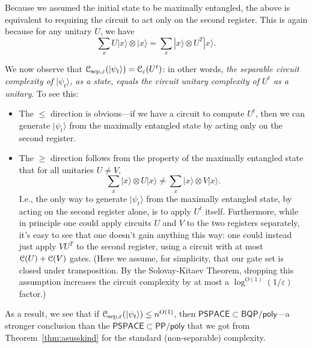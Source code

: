 \documentclass[11pt]{report}
\theoremstyle{plain}
\theoremstyle{definition}
\newcommand{\eps}{\varepsilon}
\renewcommand{\ket}[1]{|#1\rangle}
\begin{document}
Because we assumed the initial state to be maximally entangled, the above is equivalent to requiring the circuit to act only on the second register.  This is again because for any unitary $U$, we have
$$\sum_x U \ket{x} \otimes \ket{x} = \sum_x \ket{x} \otimes U^T \ket{x}.$$

We now observe that ${\cal C}_{\mathrm{sep},\eps}(\ket{\psi_t}) =
{\cal C}_\eps (U^t)$: in other words, {\em the separable circuit complexity of $\ket{\psi_t}$, as a state, equals the circuit unitary complexity of $U^t$ as a unitary}.
To see this:
\begin{itemize}
\item The $\le$ direction is obvious---if we have a circuit to compute $U^t$, then we can generate $\ket{\psi_t}$ from the maximally entangled state by acting only on the second register.
\item The $\ge$ direction follows from the property of the maximally entangled state that for all unitaries $U \neq V$,
$$\sum_x \ket{x} \otimes U \ket{x} \neq \sum_x \ket{x} \otimes V \ket{x}.$$
I.e., the only way to generate $\ket{\psi_t}$ from the maximally entangled state, by acting on the second register alone, is to apply $U^t$ itself. Furthermore, while in principle one could apply circuits $U$ and $V$ to the two registers separately, it's easy to see that one doesn't gain anything this way: one could instead just apply $VU^{T}$ to the second register, using a circuit with at most ${\cal C}(U)+{\cal C}(V)$ gates.  (Here we assume, for simplicity, that our gate set is closed under transposition.  By the Solovay-Kitaev Theorem, dropping this assumption increases the circuit complexity by at most a $\log^{O(1)}(1/\eps)$ factor.)
\end{itemize}
As a result, we see that if ${\cal C}_{\mathrm{sep},\eps}(\ket{\psi_t}) \le n^{O(1)}$, then $\mathsf{PSPACE} \subset \mathsf{BQP/poly}$---a stronger conclusion than the $\mathsf{PSPACE} \subset \mathsf{PP/poly}$ that we got from Theorem~\ref{thm:asusskind} for the standard (non-separable) complexity.
\end{document}
